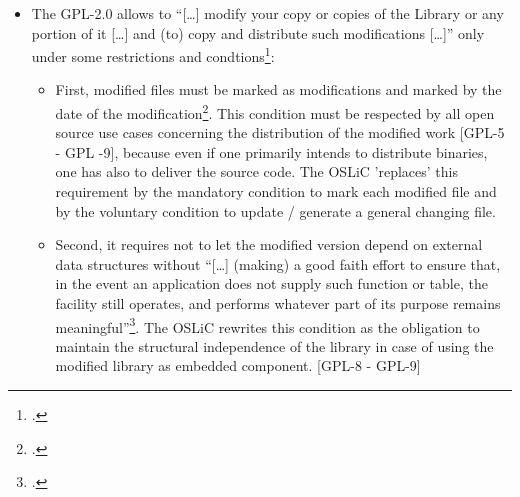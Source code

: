 \begin{itemize}
  
  And the license subspecifies this condition in
  the meaning that if one makes the object code accessible without distributing
  it directly, then the same 'download' method for the source code fulfills this
  condition\footcite[cf.][\nopage wp.\ §4]{Gpl20OsiLicense1991a}. So, no doubt:
  in a very strict reading, the GPL requires to distribute the source code and
  the object code together and by the same method: either both on (for example)
  DVD or both for being downloaded; but not the one on DVD and the other by a
  download repository. But the first specification also says, that the
  \enquote{complete corresponding machine readable source code} has to be
  distributed \enquote{on a medium customarily used for software
  interchange}\footcite[cf.][\nopage wp.\ §4]{Gpl20OsiLicense1991a}. The OSLiC
  understands the possibility to download files from the internet as a
  distribution \emph{on a medium [being today] customarily used for software
  interchange}. Therefore, the OSLiC requires to make the source code of library
  accessible via an internet repository.
  
  \item The GPL-2.0 allows to \enquote{[\ldots] modify your copy or copies of
  the Library or any portion of it [\ldots] and (to) copy and distribute such
  modifications [\ldots]} only under some restrictions and
  condtions\footcite[cf.][\nopage wp.\ §2]{Gpl20OsiLicense1991a}:
  \begin{itemize}
    \item First, modified files must be marked as modifications and marked by
    the date of the modification\footcite[cf.][\nopage wp.\
    §2]{Gpl20OsiLicense1991a}. This condition must be respected by all open
    source use cases concerning the distribution of the modified work [GPL-5 -
    GPL -9], because even if one primarily intends to distribute binaries, one
    has also to deliver the source code. The OSLiC 'replaces' this requirement
    by the mandatory condition to mark each modified file and by the voluntary
    condition to update / generate a general changing file.
    
    \item Second, it requires not to let the modified version depend on
    external data structures without \enquote{[\ldots] (making) a good faith
    effort to ensure that, in the event an application does not supply such
    function or table, the facility still operates, and performs whatever part
    of its purpose remains meaningful}\footcite[cf.][\nopage wp.\
    §2]{Gpl20OsiLicense1991a}. The OSLiC rewrites this condition as the
    obligation to maintain the structural independence of the library in case
    of using the modified library as embedded component. [GPL-8 - GPL-9]
    

\end{itemize}
\end{itemize}
